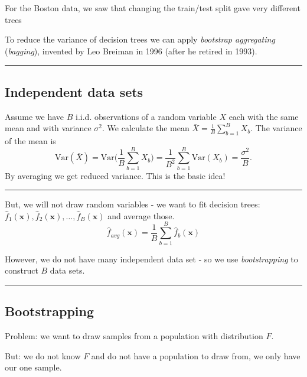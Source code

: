 \documentclass[
  letterpaper,
  DIV=11,
  numbers=noendperiod]{scrartcl}
\begin{document}
For the Boston data, we saw that changing the train/test split gave very
different trees

To reduce the variance of decision trees we can apply \emph{bootstrap
aggregating} (\emph{bagging}), invented by Leo Breiman in 1996 (after he
retired in 1993).

\begin{center}\rule{0.5\linewidth}{0.5pt}\end{center}

\hypertarget{independent-data-sets}{%
\subsection{Independent data sets}\label{independent-data-sets}}

Assume we have \(B\) i.i.d. observations of a random variable \(X\) each
with the same mean and with variance \(\sigma^2\). We calculate the mean
\(\bar{X} = \frac{1}{B} \sum_{b=1}^B X_b\). The variance of the mean is
\[\text{Var}(\bar{X}) = \text{Var}\Big(\frac{1}{B}\sum_{b=1}^B X_b \Big) = \frac{1}{B^2} \sum_{b=1}^B \text{Var}(X_b) = \frac{\sigma^2}{B}.\]
By averaging we get reduced variance. This is the basic idea!

\begin{center}\rule{0.5\linewidth}{0.5pt}\end{center}

But, we will not draw random variables - we want to fit decision trees:
\(\hat{f}_1({\mathbf x}),\hat{f}_2({\mathbf x}),\ldots, \hat{f}_B({\mathbf x})\)
and average those.
\[ \hat{f}_{avg}({\mathbf x})=\frac{1}{B}\sum_{b=1}^B \hat{f}_b({\mathbf x})\]

However, we do not have many independent data set - so we use
\emph{bootstrapping} to construct \(B\) data sets.

\begin{center}\rule{0.5\linewidth}{0.5pt}\end{center}

\hypertarget{bootstrapping}{%
\subsection{Bootstrapping}\label{bootstrapping}}

Problem: we want to draw samples from a population with distribution
\(F\).

But: we do not know \(F\) and do not have a population to draw from, we
only have our one sample.
\end{document}
